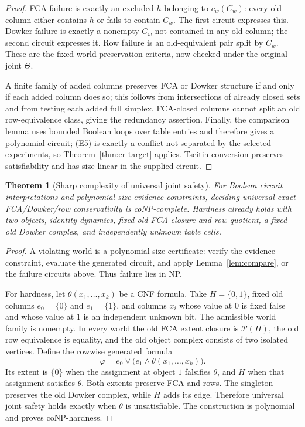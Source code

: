 \documentclass[11pt]{article}
\newtheorem{theorem}{Theorem}[section]
\theoremstyle{definition}
\newcommand{\Pow}{\mathcal P}
\begin{document}
\begin{proof}
FCA failure is exactly an excluded $h$ belonging to $c_w(C_w)$: every old column either contains $h$ or fails to contain $C_w$. The first circuit expresses this. Dowker failure is exactly a nonempty $C_w$ not contained in any old column; the second circuit expresses it. Row failure is an old-equivalent pair split by $C_w$. These are the fixed-world preservation criteria, now checked under the original joint $\Theta$.

A finite family of added columns preserves FCA or Dowker structure if and only if each added column does so; this follows from intersections of already closed sets and from testing each added full simplex. FCA-closed columns cannot split an old row-equivalence class, giving the redundancy assertion. Finally, the comparison lemma uses bounded Boolean loops over table entries and therefore gives a polynomial circuit; (E5) is exactly a conflict not separated by the selected experiments, so Theorem~\ref{thm:er-target} applies. Tseitin conversion preserves satisfiability and has size linear in the supplied circuit.
\end{proof}

\begin{theorem}[Sharp complexity of universal joint safety]\label{thm:conp}
For Boolean circuit interpretations and polynomial-size evidence constraints, deciding universal exact FCA/Dowker/row conservativity is coNP-complete. Hardness already holds with two objects, identity dynamics, fixed old FCA closure and row quotient, a fixed old Dowker complex, and independently unknown table cells.
\end{theorem}
\begin{proof}
A violating world is a polynomial-size certificate: verify the evidence constraint, evaluate the generated circuit, and apply Lemma~\ref{lem:compare}, or the failure circuits above. Thus failure lies in NP.

For hardness, let $\theta(x_1,\ldots,x_k)$ be a CNF formula. Take $H=\{0,1\}$, fixed old columns $e_0=\{0\}$ and $e_1=\{1\}$, and columns $x_i$ whose value at $0$ is fixed false and whose value at $1$ is an independent unknown bit. The admissible world family is nonempty. In every world the old FCA extent closure is $\Pow(H)$, the old row equivalence is equality, and the old object complex consists of two isolated vertices. Define the rowwise generated formula
\[
 \varphi=e_0\vee\bigl(e_1\wedge\theta(x_1,\ldots,x_k)\bigr).
\]
Its extent is $\{0\}$ when the assignment at object $1$ falsifies $\theta$, and $H$ when that assignment satisfies $\theta$. Both extents preserve FCA and rows. The singleton preserves the old Dowker complex, while $H$ adds its edge. Therefore universal joint safety holds exactly when $\theta$ is unsatisfiable. The construction is polynomial and proves coNP-hardness.
\end{proof}
\end{document}
